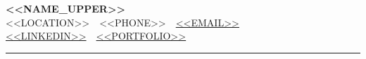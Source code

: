 
\begin{center}
  {\LARGE\bfseries <<NAME_UPPER>>}\\[3pt]
  <<LOCATION>> \,\textbar\, <<PHONE>> \,\textbar\,
  \href{mailto:<<EMAIL>>}{<<EMAIL>>}\\[1pt]
  \href{https://<<LINKEDIN>>}{<<LINKEDIN>>}
  \,\textbar\,
  \href{https://<<PORTFOLIO>>}{<<PORTFOLIO>>}
\end{center}
\vspace{-6pt}
{\color{rulegray}\rule{\textwidth}{0.4pt}}
\vspace{-2pt}
